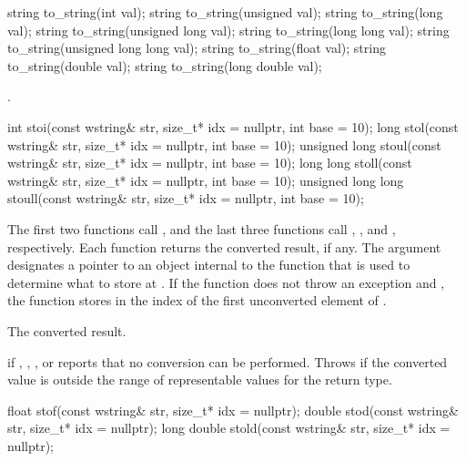 %
\begin{itemdecl}
string to_string(int val);
string to_string(unsigned val);
string to_string(long val);
string to_string(unsigned long val);
string to_string(long long val);
string to_string(unsigned long long val);
string to_string(float val);
string to_string(double val);
string to_string(long double val);
\end{itemdecl}

\begin{itemdescr}
\pnum
\returns
{}.
\end{itemdescr}

%
%
%
%
%
\begin{itemdecl}
int stoi(const wstring& str, size_t* idx = nullptr, int base = 10);
long stol(const wstring& str, size_t* idx = nullptr, int base = 10);
unsigned long stoul(const wstring& str, size_t* idx = nullptr, int base = 10);
long long stoll(const wstring& str, size_t* idx = nullptr, int base = 10);
unsigned long long stoull(const wstring& str, size_t* idx = nullptr, int base = 10);
\end{itemdecl}

\begin{itemdescr}
\pnum
\effects
The first two functions call ,
and the last three functions call ,
, and , respectively. Each function returns the converted result, if any. The
argument  designates a pointer to an object internal to the function
that is used to determine what to store at . If the function does
not throw an exception and , the function stores in 
the index of the first unconverted element of .

\pnum
\returns
The converted result.

\pnum
\throws
{} if , , , or
 reports that no conversion can be performed. Throws
 if the converted value is outside the range of representable values
for the return type.
\end{itemdescr}

%
%
%
\begin{itemdecl}
float stof(const wstring& str, size_t* idx = nullptr);
double stod(const wstring& str, size_t* idx = nullptr);
long double stold(const wstring& str, size_t* idx = nullptr);
\end{itemdecl}

